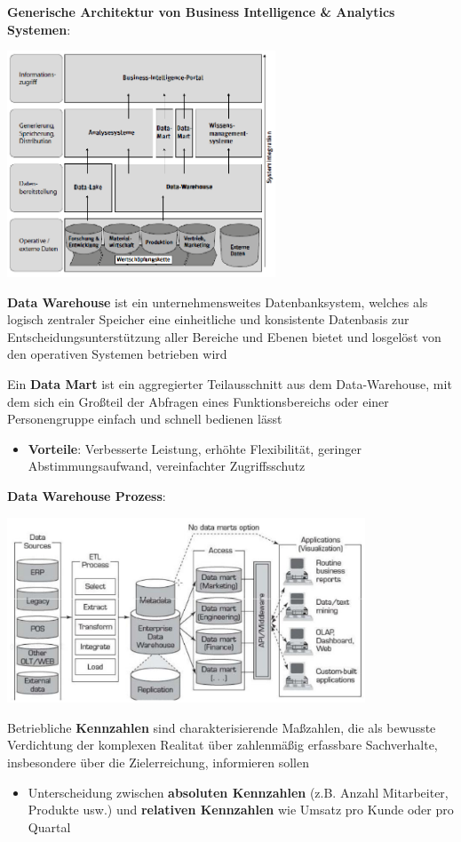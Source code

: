 \textbf{Generische Architektur von Business Intelligence \& Analytics Systemen}:
\begin{center}
	\includegraphics[width=0.6\textwidth]{images/bias.png}
\end{center}

\textbf{Data Warehouse} ist ein unternehmensweites Datenbanksystem, welches als logisch zentraler Speicher eine einheitliche und konsistente Datenbasis zur Entscheidungsunterstützung aller Bereiche und Ebenen bietet und losgelöst von den operativen Systemen betrieben wird

Ein \textbf{Data Mart} ist ein aggregierter Teilausschnitt aus dem Data-Warehouse, mit dem sich ein Großteil der Abfragen eines Funktionsbereichs oder einer Personengruppe einfach und schnell bedienen lässt
\begin{itemize}
	\item \textbf{Vorteile}: Verbesserte Leistung, erhöhte Flexibilität, geringer Abstimmungsaufwand, vereinfachter Zugriffsschutz
\end{itemize}

\pagebreak
\textbf{Data Warehouse Prozess}:
\begin{center}
	\includegraphics[width=0.8\textwidth]{images/dwp.png}
\end{center}

Betriebliche \textbf{Kennzahlen} sind charakterisierende Maßzahlen, die als bewusste Verdichtung der komplexen Realitat über zahlenmäßig erfassbare Sachverhalte, insbesondere über die Zielerreichung, informieren sollen
\begin{itemize}
	\item Unterscheidung zwischen \textbf{absoluten Kennzahlen} (z.B. Anzahl Mitarbeiter, Produkte usw.) und \textbf{relativen Kennzahlen} wie Umsatz pro Kunde oder pro Quartal
\end{itemize}

